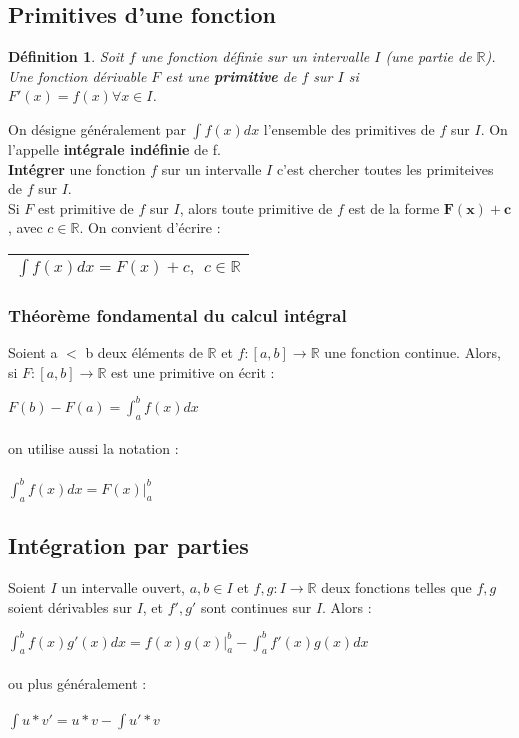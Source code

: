 \documentclass[12pt, a4paper]{book}
\newtheorem*{definition}{Définition}
\begin{document}
\subsection{Primitives d'une fonction}
\begin{definition}
    Soit $f$ une fonction définie sur un intervalle $I$ (une partie de $\mathbb{R}$). Une fonction dérivable $F$ est une \textbf{primitive} de $f$ sur $I$ si\\
     $F'(x) = f(x) \forall x \in I$.
\end{definition}
On désigne généralement par $\int f(x)dx$ l'ensemble des primitives de $f$ sur $I$. On l'appelle \textbf{intégrale indéfinie} de f.\\
\textbf{Intégrer} une fonction $f$ sur un intervalle $I$ c'est chercher toutes les primiteives de $f$ sur $I$.\\
Si $F$ est primitive de $f$ sur $I$, alors toute primitive de $f$ est de la forme $\mathbf{F(x)+c}$, avec $c \in \mathbb{R}$. On convient d'écrire :\\
\begin{center}
    \begin{tabular}{ |c|}
        \hline
       $\int f(x)dx = F(x)+c, \ \ c \in \mathbb{R}$\\
        \hline
    \end{tabular}
\end{center}
\subsubsection{Théorème fondamental du calcul intégral}
Soient a $<$ b deux éléments de $\mathbb{R}$ et $f:[a,b]\rightarrow \mathbb{R}$ une fonction continue.
Alors, si $F:[a,b]\rightarrow \mathbb{R}$ est une primitive on écrit :
\begin{center}
    $F(b)-F(a)=\int_{a}^{b} f(x) dx$\\
    \ \\
    on utilise aussi la notation :\\
    \ \\
    $\int_{a}^{b} f(x) dx = F(x)|^b _a$
\end{center}
\subsection{Intégration par parties}
Soient $I$ un intervalle ouvert, $a,b \in I$ et $f,g:I \rightarrow \mathbb{R}$ deux fonctions telles que
$f,g$ soient dérivables sur $I$, et $f',g'$ sont continues sur $I$. Alors :\\
\begin{center}
    $\int_{a}^{b} f(x)g'(x) dx = f(x)g(x)|^b _a- \int_{a}^{b} f'(x)g(x) dx$\\
    \ \\
    ou plus généralement :\\
    \ \\
    $\int u*v' = u*v- \int u'* v $\\
\end{center}
\end{document}
